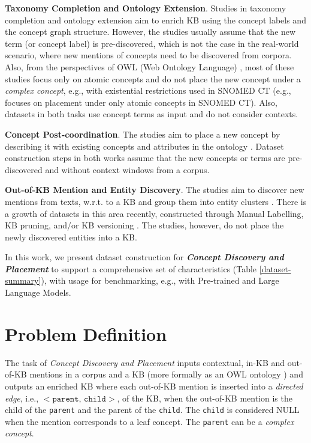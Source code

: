 \documentclass[sigconf]{acmart}
\begin{document}
\noindent\textbf{Taxonomy Completion and Ontology Extension}. Studies in taxonomy completion \cite{Wang2022QEN,Zeng2021,zhang2021TMN,Shen2020TaxoExpan,jurgens-pilehvar-2016-semeval} and ontology extension \cite{glauer2022interpretable} aim to enrich KB using the concept labels and the concept graph structure. However, the studies usually assume that the new term (or concept label) is pre-discovered, which is not the case in the real-world scenario, where new mentions of concepts need to be discovered from corpora. Also, from the perspectives of OWL (Web Ontology Language) \cite{GRAU2008OWL2,baader_horrocks_lutz_sattler_2017chap8}, 
most of these studies focus only on atomic concepts and do not place the new concept under a \textit{complex concept}, e.g., with existential restrictions used in SNOMED CT (e.g., \cite{Liu2020placement} focuses on placement under only atomic concepts in SNOMED CT). Also, datasets in both tasks use concept terms as input and do not consider contexts. 

\noindent\textbf{Concept Post-coordination}. The studies aim to place a new concept by describing it with existing concepts and attributes in the ontology \cite{kate2020,castell2023postcoordination}. Dataset construction steps in both works \cite{kate2020,castell2023postcoordination} assume that the new concepts or terms are pre-discovered and without context windows from a corpus. 

\noindent\textbf{Out-of-KB Mention and Entity Discovery}. The studies aim to discover new mentions from texts, w.r.t. to a KB \cite{dong2023NIL,suominen2013shareclef} and group them into entity clusters \cite{Iurshina2022nilk,kassner2022edin,rizzo2017NEEL,ji2011TAC}. There is a growth of datasets in this area recently, constructed through Manual Labelling, KB pruning, and/or KB versioning \cite{dong2023NIL}. The studies, however, do not place the newly discovered entities into a KB. 

In this work, we present dataset construction for \textit{\textbf{Concept Discovery and Placement}} to support a comprehensive set of characteristics (Table \ref{dataset-summary}), with usage for benchmarking, e.g., with Pre-trained and Large Language Models. 

\section{Problem Definition}

The task of \textit{Concept Discovery and Placement} inputs contextual, in-KB and out-of-KB mentions in a corpus and a KB (more formally as an OWL ontology \cite{GRAU2008OWL2,baader_horrocks_lutz_sattler_2017chap8}) and outputs an enriched KB where each out-of-KB mention is inserted into a \textit{directed edge}, i.e., $<\texttt{parent, child}>$, of the KB, when the out-of-KB mention is the child of the \texttt{parent} and the parent of the \texttt{child}. The \texttt{child} is considered NULL when the mention corresponds to a leaf concept. The \texttt{parent} can be a \textit{complex concept}. 
\end{document}
